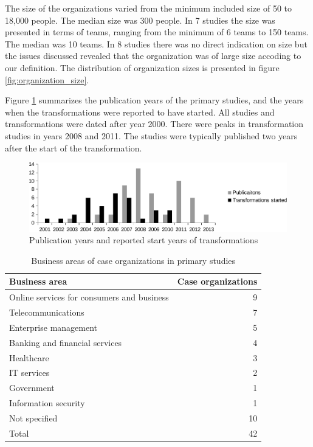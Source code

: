 \documentclass[preprint,authoryear,12pt]{elsarticle}
\begin{document}
The size of the organizations varied from the minimum included size of 50 to
18,000 people. The median size was 300 people. In 7 studies the size was
presented in terms of teams, ranging from the minimum of 6 teams to 150 teams.
The median was 10 teams. In 8 studies there was no direct indication on size
but the issues discussed revealed that the organization was of large size
accoding to our definition. The distribution of organization sizes is presented
in figure \ref{fig:organization_size}.

Figure \ref{fig:transformation_time} summarizes the publication years of the
primary studies, and the years when the transformations were reported to have
started. All studies and transformations were dated after year 2000. There were
peaks in transformation studies in years 2008 and 2011. The studies were
typically published two years after the start of the transformation.

\begin{figure}[t]
  \begin{center}
    \includegraphics[width=1\textwidth]{graphics/transformation_time.pdf}
    \caption{Publication years and reported start years of transformations}
    \label{fig:transformation_time}
  \end{center}
\end{figure}

\begin{table}[bh]
    \begin{tabular}{ l r }
        \toprule
        Business area    &  Case organizations   \\
        \midrule
		Online services for consumers and business  &  9  \\
		Telecommunications                          &  7  \\
		Enterprise management                       &  5  \\
		Banking and financial services              &  4  \\
		Healthcare                                  &  3  \\
		IT services                                 &  2  \\
		Government                                  &  1  \\
		Information security                        &  1  \\
		Not specified                               & 10  \\
        \midrule
		Total                                       & 42  \\
        \bottomrule
    \end{tabular}
    \caption{Business areas of case organizations in primary studies}
    \label{table:businessareas}
\end{table}
\end{document}

